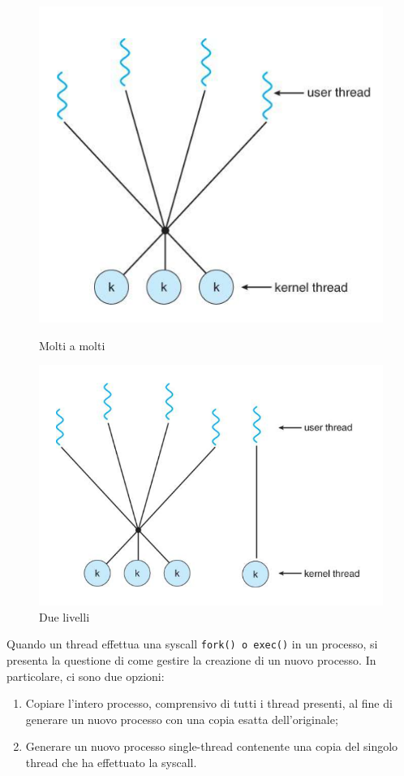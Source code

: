\documentclass{article}
\begin{document}
    \begin{figure}[h]
    \begin{minipage}{0.5\textwidth}
    \centering
    \includegraphics[width=0.7\linewidth]{im/3m}
    \caption{Molti a molti}    
    \end{minipage}
    \begin{minipage}{0.5\textwidth}
    \centering
    \includegraphics[width=0.7\linewidth]{im/4m}
    \caption{Due livelli}    
    \end{minipage}
    \end{figure}

    Quando un thread effettua una syscall \texttt{fork() {o} exec()} in un processo, si presenta la questione di come gestire la creazione di un nuovo processo. In particolare, ci sono due opzioni:
    \begin{enumerate}
        \item Copiare l'intero processo, comprensivo di tutti i thread presenti, al fine di generare un nuovo processo con una copia esatta dell'originale;
        \item Generare un nuovo processo single-thread contenente una copia del singolo thread che ha effettuato la syscall.
    \end{enumerate}
        
\end{document}

